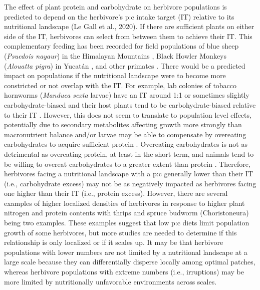 \documentclass[
]{article}
\begin{document}
The effect of plant protein and carbohydrate on herbivore populations is
predicted to depend on the herbivore's p:c intake target (IT) relative
to its nutritional landscape (Le Gall et al., 2020). If there are
sufficient plants on either side of the IT, herbivores can select from
between them to achieve their IT. This complementary feeding has been
recorded for field populations of blue sheep (\emph{Psuedois nayaur}) in
the Himalayan Mountains \citep{aryal_foods_2015}, Black Howler Monkeys
(\emph{Alouatta pigra}) in Yucatán \citep{bridgeman_feeding_2012}, and
other primates \citep{raubenheimer_nutritional_2013}. There would be a
predicted impact on populations if the nutritional landscape were to
become more constricted or not overlap with the IT. For example, lab
colonies of tobacco hornworms (\emph{Manduca sexta} larvae) have an IT
around 1:1 or sometimes slightly carbohydrate-biased
\citep{wilson_dietary_2019} and their host plants tend to be
carbohydrate-biased relative to their IT
\citep{wilson_nutritional_2019}. However, this does not seem to
translate to population level effects, potentially due to secondary
metabolites affecting growth more strongly than macronutrient balance
and/or larvae may be able to compensate by overeating carbohydrates to
acquire sufficient protein \citep{wilson_dietary_2019}. Overeating
carbohydrates is not as detrimental as overeating protein, at least in
the short term, and animals tend to be willing to overeat carbohydrates
to a greater extent than protein
\citep{cheng_geometry_2008, simpson_nature_2012}. Therefore, herbivores
facing a nutritional landscape with a p:c generally lower than their IT
(i.e., carbohydrate excess) may not be as negatively impacted as
herbivores facing one higher than their IT (i.e., protein excess).
However, there are several examples of higher localized densities of
herbivores in response to higher plant nitrogen and protein contents
with thrips \citep{brown_relationship_2002} and spruce budworm
(Choristoneura) \citep{de_grandpre_defoliation-induced_2022} being two
examples. These examples suggest that low p:c diets limit population
growth of some herbivores, but more studies are needed to determine if
this relationship is only localized or if it scales up. It may be that
herbivore populations with lower numbers are not limited by a
nutritional landscape at a large scale because they can differentially
disperse locally among optimal patches, whereas herbivore populations
with extreme numbers (i.e., irruptions) may be more limited by
nutritionally unfavorable environments across scales.
\end{document}
